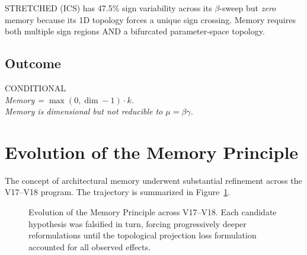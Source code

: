 \documentclass[11pt,a4paper,oneside]{report}
\newcommand{\supported}{\textcolor{supported}{SUPPORTED}}
\newcommand{\conditional}{\textcolor{conditional}{CONDITIONAL}}
\newcommand{\falsified}{\textcolor{falsified}{FALSIFIED}}
\begin{document}
STRETCHED (ICS) has 47.5\% sign variability across its $\beta$-sweep but
\textit{zero} memory because its 1D topology forces a unique sign crossing.
Memory requires both multiple sign regions AND a bifurcated parameter-space
topology.

\subsection{Outcome}

\begin{center}
\conditional{}\\[4pt]
\textit{Memory = $\max(0, \dim-1) \cdot k$.}\\[2pt]
\textit{Memory is dimensional but not reducible to $\mu = \beta\gamma$.}
\end{center}

\section{Evolution of the Memory Principle}

The concept of architectural memory underwent substantial refinement
across the V17--V18 program. The trajectory is summarized in
Figure~\ref{fig:memory-evolution}.

\begin{figure}[h]
\centering
{}
\caption{Evolution of the Memory Principle across V17--V18. Each candidate
  hypothesis was falsified in turn, forcing progressively deeper
  reformulations until the topological projection loss formulation
  accounted for all observed effects.}
\label{fig:memory-evolution}
\end{figure}
\end{document}
